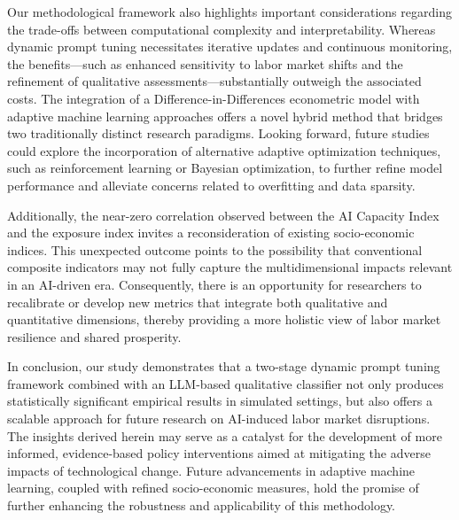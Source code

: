 \documentclass{article} %
\begin{document}
Our methodological framework also highlights important considerations regarding the trade-offs between computational complexity and interpretability. Whereas dynamic prompt tuning necessitates iterative updates and continuous monitoring, the benefits—such as enhanced sensitivity to labor market shifts and the refinement of qualitative assessments—substantially outweigh the associated costs. The integration of a Difference-in-Differences econometric model with adaptive machine learning approaches offers a novel hybrid method that bridges two traditionally distinct research paradigms. Looking forward, future studies could explore the incorporation of alternative adaptive optimization techniques, such as reinforcement learning or Bayesian optimization, to further refine model performance and alleviate concerns related to overfitting and data sparsity.

Additionally, the near-zero correlation observed between the AI Capacity Index and the exposure index invites a reconsideration of existing socio-economic indices. This unexpected outcome points to the possibility that conventional composite indicators may not fully capture the multidimensional impacts relevant in an AI-driven era. Consequently, there is an opportunity for researchers to recalibrate or develop new metrics that integrate both qualitative and quantitative dimensions, thereby providing a more holistic view of labor market resilience and shared prosperity.

In conclusion, our study demonstrates that a two-stage dynamic prompt tuning framework combined with an LLM-based qualitative classifier not only produces statistically significant empirical results in simulated settings, but also offers a scalable approach for future research on AI-induced labor market disruptions. The insights derived herein may serve as a catalyst for the development of more informed, evidence-based policy interventions aimed at mitigating the adverse impacts of technological change. Future advancements in adaptive machine learning, coupled with refined socio-economic measures, hold the promise of further enhancing the robustness and applicability of this methodology.



\end{document}
